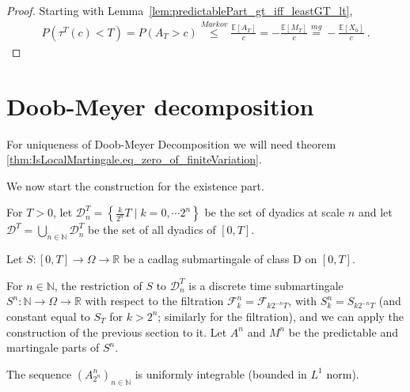 \begin{proof}
Starting with Lemma~\ref{lem:predictablePart_gt_iff_leastGT_lt},
\begin{align*}
  P(\tau^T(c)<T)
  =P(A_T>c)
  \stackrel{Markov}{\leq}\frac{\mathbb{E}[A_T]}{c}
  =-\frac{\mathbb{E}[M_T]}{c}
  \stackrel{mg}{=}-\frac{\mathbb{E}[X_0]}{c}
  \: .
\end{align*}
\end{proof}





\section{Doob-Meyer decomposition}



For uniqueness of Doob-Meyer Decomposition we will need theorem \ref{thm:IsLocalMartingale.eq_zero_of_finiteVariation}.

We now start the construction for the existence part.


\begin{definition}[Dyadics]\label{def:dyadics}
For $T>0$, let $\mathcal{D}_n^T = \left\lbrace \frac{k}{2^n}T \mid k=0,\cdots 2^n\right\rbrace$ be the set of dyadics at scale $n$ and let $\mathcal{D}^T=\bigcup_{n\in\mathbb{N}}\mathcal{D}_n^T$ be the set of all dyadics of $[0,T]$.
\end{definition}

Let $S : [0,T] \to \Omega \to \mathbb{R}$ be a cadlag submartingale of class D on $[0,T]$.



\begin{definition}[S, A, M]\label{def:SAM}
For $n \in \mathbb{N}$, the restriction of $S$ to $\mathcal{D}_n^T$ is a discrete time submartingale $S^n : \mathbb{N} \to \Omega \to \mathbb{R}$ with respect to the filtration $\mathcal{F}^n_k = \mathcal{F}_{k2^{-n}T}$, with $S^n_k = S_{k2^{-n}T}$ (and constant equal to $S_T$ for $k > 2^n$; similarly for the filtration), and we can apply the construction of the previous section to it.
Let $A^n$ and $M^n$ be the predictable and martingale parts of $S^n$.
\end{definition}


\begin{lemma}\label{lem:A_uniform_integrable}
  The sequence $(A^n_{2^n})_{n\in\mathbb{N}}$ is uniformly integrable (bounded in $L^1$ norm).
\end{lemma}

